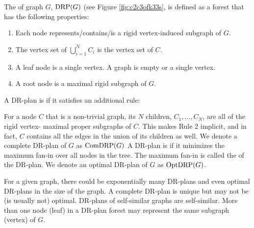 %
\begin{definition}\label{def:drp}
    The  of graph
    $G$, \cite{hoffman2001decompositionI} $\text{DRP}(G)$ (see Figure \ref{fig:c2c3ofk33s}, is defined as a forest that has the
    following properties:
    \begin{enumerate}
        \item Each node represents/contains/is a rigid vertex-induced
        subgraph of $G$.
        \item The vertex set of $\bigcup_{i=1}^N{C_i}$ is the vertex
        set of $C$.
        \item A leaf node is a single vertex.
A  graph is empty or a single vertex.
        \item A root node is a maximal rigid subgraph of $G$.
    \end{enumerate}
%
%
    A DR-plan is  if it satisfies an additional rule:
        \item For a node $C$ that is  a non-trivial graph, its $N$
        children, $C_1, \ldots, C_N$, are all of the rigid vertex-
        maximal proper subgraphs of $C$. This makes Rule 2 implicit,
        and in fact, $C$ contains all the edges in the union of its
        children as well.
        We denote a complete DR-plan of $G$ as $\text{ComDRP}(G)$
    A DR-plan is  if it minimizes the maximum fan-in over all nodes in the tree.
    The maximum  fan-in is called the  of the DR-plan.
    We denote an optimal DR-plan of $G$ as $\text{OptDRP}(G)$.

%
\end{definition}
%
\begin{remark}
    For a given graph, there could be exponentially many  DR-plans and
    even optimal DR-plans in the size of the graph. A complete DR-plan
    is unique but may not be (is usually not) optimal. DR-plans
    of self-similar graphs are self-similar. More than one node (leaf)
    in a DR-plan forest may represent the same subgraph (vertex) of
    $G$.
\end{remark}

